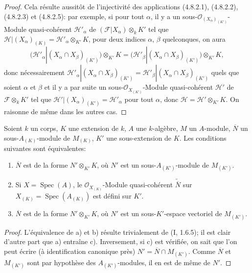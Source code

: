 \begin{proof}
Cela résulte aussitôt de l'injectivité des applications (4.8.2.1), (4.8.2.2),
(4.8.2.3) et (4.8.2.5): par exemple, si pour tout $\alpha$, il y a un
sous-$\mathcal O_{(X_\alpha)_{(K')}}$-Module quasi-cohérent
$\mathscr H'_\alpha$ de $(\mathscr F|X_\alpha)\otimes_kK'$ tel que
$\mathscr H|(X_\alpha)_{(K)}=\mathscr H'_\alpha\otimes_{K'}K$, pour deux
indices $\alpha$, $\beta$ quelconques, on aura
\[
\bigl(\mathscr H'_\alpha|(X_\alpha\cap X_\beta)_{(K')}\bigr)
 \otimes_{K'}K
=\bigl(\mathscr H'_\beta|(X_\alpha\cap X_\beta)_{(K')}\bigr)
 \otimes_{K'}K,
\]
donc nécessairement
$\mathscr H'_\alpha|(X_\alpha\cap X_\beta)_{(K')}
=\mathscr H'_\beta|(X_\alpha\cap X_\beta)_{(K')}$ quels que soient
$\alpha$ et $\beta$ et il y a par suite un sous-$\mathcal O_{X_{(K')}}$-Module
quasi-cohérent $\mathscr H'$ de $\mathscr F\otimes_kK'$ tel que
$\mathscr H'|(X_\alpha)_{(K')}=\mathscr H'_\alpha$ pour tout $\alpha$, donc
$\mathscr H=\mathscr H'\otimes_{K'}K$. On raisonne de même dans les autres
cas.
\end{proof}

\begin{lemma}[4.8.6]
\label{IV.2.4.8.6-fr}
Soient $k$ un corps, $K$ une extension de $k$, $A$ une $k$-algèbre, $M$ un
$A$-module, $\overline N$ un sous-$A_{(K)}$-module de $M_{(K)}$, $K'$ une
sous-extension de $K$. Les conditions suivantes sont équivalentes:
\begin{enumerate}
\item[a)] $\overline N$ est de la forme $N'\otimes_{K'}K$, où $N'$ est un
sous-$A_{(K')}$-module de $M_{(K')}$. 
\item[b)] Si $X=\operatorname{Spec}(A)$, le
$\mathcal O_{X_{(K)}}$-Module quasi-cohérent $\widetilde{\overline N}$ sur
$X_{(K)}=\operatorname{Spec}(A_{(K)})$ est défini sur $K'$.
\item[c)] $\overline N$ est de la forme $N'\otimes_{K'}K$, où $N'$ est un
sous-$K'$-espace vectoriel de $M_{(K')}$. 
\end{enumerate}
\end{lemma}


\begin{proof}
L'équivalence de a) et b) résulte trivialement de (I, 1.6.5); il est clair
d'autre part que a) entraîne c). Inversement, si c) est vérifiée, on sait que
l'on peut écrire (à identification canonique près)
$N'=\overline N\cap M_{(K')}$. Comme $\overline N$ et $M_{(K')}$ sont par
hypothèse des $A_{(K')}$-modules, il en est de même de $N'$.
\end{proof}

